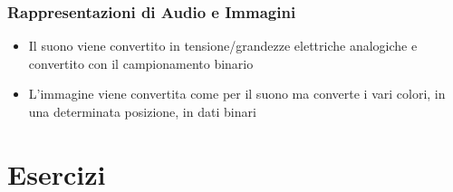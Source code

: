 \documentclass[a4paper,12pt, oneside]{book}
\begin{document}
\subsubsection{Rappresentazioni di Audio e Immagini}
\begin{itemize}
  \item Il suono viene convertito in tensione/grandezze elettriche analogiche e convertito con il campionamento binario
  \item L'immagine viene convertita come per il suono ma converte i vari colori, in una determinata posizione, in dati binari
\end{itemize}
\newpage
\section{Esercizi}
\end{document}
